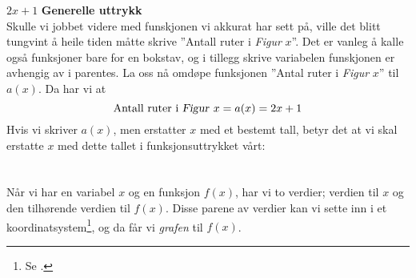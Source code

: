 \st{$ {2x+1} $}
\newpage
\textbf{Generelle uttrykk} \\
Skulle vi jobbet videre med funskjonen vi akkurat har sett på, ville det blitt tungvint å heile tiden måtte skrive ''Antall ruter i \textsl{Figur }$ x $''. Det er vanleg å kalle også funksjoner bare for en bokstav, og i tillegg skrive variabelen funskjonen er avhengig av i parentes. La oss nå omdøpe funksjonen ''Antal ruter i \textsl{Figur} $ x $'' til $ a(x) $. Da har vi at
\[ \text{Antall ruter i \textsl{Figur }}x=a(x)=2x+1 \]
Hvis vi skriver $ a(x) $, men erstatter $ x $ med et bestemt tall, betyr det at vi skal erstatte $ x $ med dette tallet i funksjonsuttrykket vårt:
\newpage
{}
\section{\lingraf}
Når vi har en variabel $ x $ og en funksjon $ f(x) $, har vi to verdier; verdien til $ x $ og den tilhørende verdien til $ f(x) $. Disse parene av verdier kan vi sette inn i et koordinatsystem\footnote{Se .}, og da får vi \textit{grafen} til $ f(x) $. \vsk

